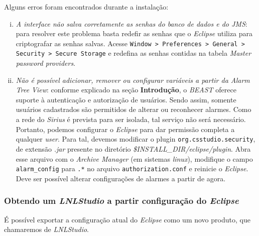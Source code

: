 Alguns erros foram encontrados durante a instalação:

\begin{enumerate}[i.]
  \item \textit{A interface não salva corretamente as senhas do banco de dados e
  do JMS}: para resolver este problema basta redefir as senhas que o
  \textit{Eclipse} utiliza para criptografar as senhas salvas. Acesse
  \texttt{Window > Preferences > General > Security > Secure Storage} e redefina
  as senhas contidas na tabela \textit{Master password providers}.

  \item \textit{Não é possível adicionar, remover ou configurar variáveis a
  partir da Alarm Tree View}: conforme explicado na seção \textbf{Introdução}, o
  \textit{BEAST} oferece suporte à autenticação e autorização de usuários. Sendo
  assim, somente usuários cadastrados são permitidos de alterar ou reconhecer
  alarmes. Como a rede do \textit{Sirius} é prevista para ser isolada, tal
  serviço não será necessário. Portanto, podemos configurar o \textit{Eclipse}
  para dar permissão completa a qualquer \textit{user}. Para tal, devemos
  modificar o plugin \texttt{org.csstudio.security}, de extensão \textit{.jar}
  presente no diretório \textit {\$INSTALL\_DIR/eclipse/plugin}. Abra esse
  arquivo com o \textit{Archive Manager} (em sistemas \textit{linux}),
  modifique o campo \texttt{alarm\_config} para \texttt{.*} no arquivo
  \texttt{authorization.conf} e reinicie o \textit{Eclipse}. Deve ser possível
  alterar configurações de alarmes a partir de agora.
\end{enumerate}

\subsubsection {Obtendo um \textit{LNLStudio} a partir configuração do
\textit{Eclipse}}

É possível exportar a configuração atual do \textit{Eclipse} como um novo
produto, que chamaremos de \textit{LNLStudio}.
